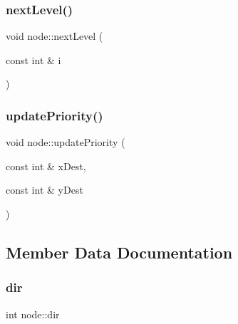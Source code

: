 \mbox{\label{classnode_a04a186013c42fb942b6da90d2e98d4ed}} 
\subsubsection{\texorpdfstring{next\+Level()}{nextLevel()}}
{\footnotesize\ttfamily void node\+::next\+Level (\begin{DoxyParamCaption}\item[{const int \&}]{i }\end{DoxyParamCaption})\hspace{0.3cm}{\ttfamily [inline]}}

\mbox{\label{classnode_ad51b92de008bd5107a7b55cc61fc497b}} 
\subsubsection{\texorpdfstring{update\+Priority()}{updatePriority()}}
{\footnotesize\ttfamily void node\+::update\+Priority (\begin{DoxyParamCaption}\item[{const int \&}]{x\+Dest,  }\item[{const int \&}]{y\+Dest }\end{DoxyParamCaption})\hspace{0.3cm}{\ttfamily [inline]}}



\subsection{Member Data Documentation}
\mbox{\label{classnode_a6dabe9db170ea2dbfc8c88df9c196506}} 
\subsubsection{\texorpdfstring{dir}{dir}}
{\footnotesize\ttfamily int node\+::dir\hspace{0.3cm}{\ttfamily [private]}}

\mbox{\label{classnode_a3871d43e823ba9542b052912d01709dd}} 
